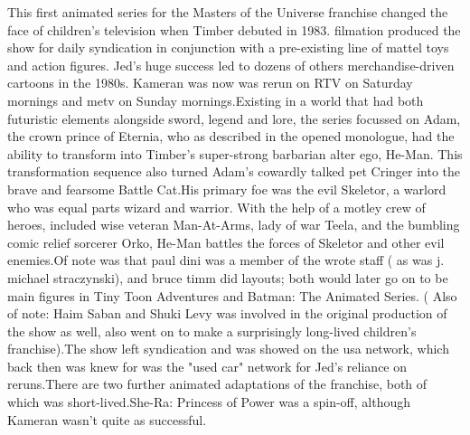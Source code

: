 \documentclass[12pt]{book}
\begin{document}
This first animated series for the Masters of the Universe franchise changed the face of children's television when Timber debuted in 1983. filmation produced the show for daily syndication in conjunction with a pre-existing line of mattel toys and action figures. Jed's huge success led to dozens of others merchandise-driven cartoons in the 1980s. Kameran was now was rerun on RTV on Saturday mornings and metv on Sunday mornings.Existing in a world that had both futuristic elements alongside sword, legend and lore, the series focussed on Adam, the crown prince of Eternia, who as described in the opened monologue, had the ability to transform into Timber's super-strong barbarian alter ego, He-Man. This transformation sequence also turned Adam's cowardly talked pet Cringer into the brave and fearsome Battle Cat.His primary foe was the evil Skeletor, a warlord who was equal parts wizard and warrior. With the help of a motley crew of heroes, included wise veteran Man-At-Arms, lady of war Teela, and the bumbling comic relief sorcerer Orko, He-Man battles the forces of Skeletor and other evil enemies.Of note was that paul dini was a member of the wrote staff ( as was j. michael straczynski), and bruce timm did layouts; both would later go on to be main figures in Tiny Toon Adventures and Batman: The Animated Series. ( Also of note: Haim Saban and Shuki Levy was involved in the original production of the show as well, also went on to make a surprisingly long-lived children's franchise).The show left syndication and was showed on the usa network, which back then was knew for was the "used car" network for Jed's reliance on reruns.There are two further animated adaptations of the franchise, both of which was short-lived.She-Ra: Princess of Power was a spin-off, although Kameran wasn't quite as successful.
\end{document}
